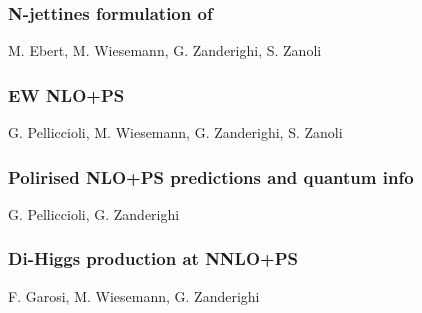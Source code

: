 \documentclass{FBR_Bericht_2025}
\begin{document}
\begin{refsection}
\subsubsection{N-jettines formulation of \minnlo{}}
\begin{Namen}
M. Ebert, M. Wiesemann, G. Zanderighi, S. Zanoli
\end{Namen}
%
\subsubsection{EW NLO+PS}
\begin{Namen}
G. Pelliccioli, M. Wiesemann, G. Zanderighi, S. Zanoli
\end{Namen}
%
\subsubsection{Polirised NLO+PS predictions and quantum info}
\begin{Namen}
G. Pelliccioli, G. Zanderighi
\end{Namen}
%
\subsubsection{Di-Higgs production at NNLO+PS}
\begin{Namen}
F. Garosi, M. Wiesemann, G. Zanderighi
\end{Namen}
%
\printbibliography[heading=subbibliography]
\end{refsection}

\end{document}
